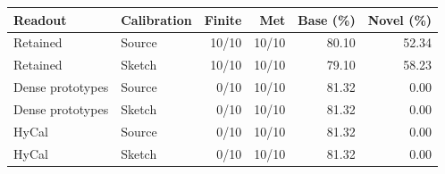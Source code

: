 \begin{tabular}{@{}llrrrr@{}}
\toprule
Readout & Calibration & Finite & Met & Base (\%) & Novel (\%) \\
\midrule
Retained & Source & 10/10 & 10/10 & 80.10 & 52.34 \\
Retained & Sketch & 10/10 & 10/10 & 79.10 & 58.23 \\
\midrule
Dense prototypes & Source & 0/10 & 10/10 & 81.32 & 0.00 \\
Dense prototypes & Sketch & 0/10 & 10/10 & 81.32 & 0.00 \\
\midrule
HyCal & Source & 0/10 & 10/10 & 81.32 & 0.00 \\
HyCal & Sketch & 0/10 & 10/10 & 81.32 & 0.00 \\
\bottomrule
\end{tabular}
